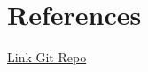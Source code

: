 \section{References}

\begin{thebibliography}{9}

\bibitem \href{https://www.raylib.com/}{}
\bibitem \href{https://refactoring.guru/}{}

\bibitem \href{https://github.com/Kisara05/CS163-DSAVisualization}{Link Git Repo}

\end{thebibliography}